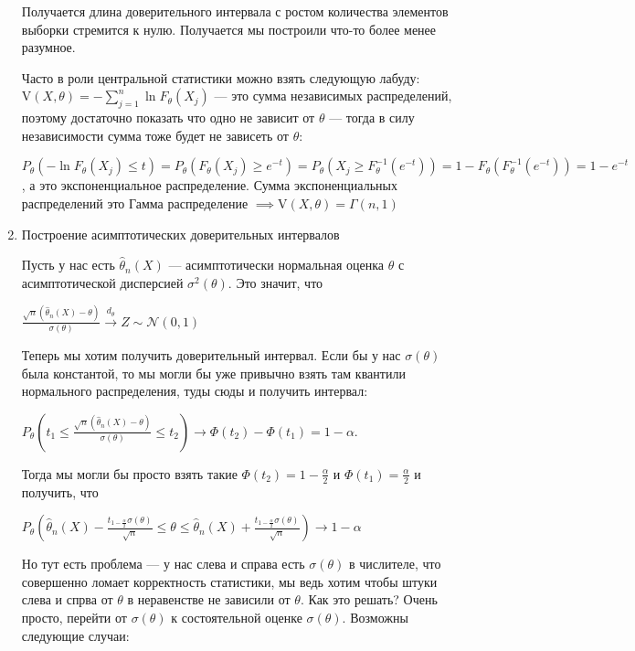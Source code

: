 \begin{enumerate}
\begin{example}
        Получается длина доверительного интервала с ростом количества элементов выборки стремится к нулю.
        Получается мы построили что-то более менее разумное.

        Часто в роли центральной статистики можно взять следующую лабуду: 
        $\text{V}(X, \theta) = -\sum_{j = 1}^n \ln F_\theta(X_j)$ --- это сумма независимых распределений,
        поэтому достаточно показать что одно не зависит от $\theta$ --- тогда в силу независимости сумма тоже
        будет не зависеть от $\theta$:

        $P_\theta(-\ln F_\theta(X_j) \leq t) = P_\theta(F_\theta(X_j) \geq e^{-t}) =
        P_\theta(X_j \geq F_\theta^{-1}(e^{-t})) = 1 - F_\theta(F_\theta^{-1}(e^{-t})) = 1 - e^{-t}$, а это
        экспоненциальное распределение. Сумма экспоненциальных распределений это Гамма распределение
        $\implies \text{V}(X, \theta) = \Gamma(n, 1)$
    \end{example}

    \item Построение асимптотических доверительных интервалов
    
    Пусть у нас есть $\hat{\theta}_n(X)$ --- асимптотически нормальная оценка $\theta$ с
    асимптотической дисперсией $\sigma^2(\theta)$. Это значит, что

    $\frac{\sqrt{n}(\hat{\theta}_n(X) - \theta)}{\sigma(\theta)} \xrightarrow{d_\theta} Z \sim \mathcal{N}(0, 1)$

    Теперь мы хотим получить доверительный интервал. Если бы у нас $\sigma(\theta)$ была константой,
    то мы могли бы уже привычно взять там квантили нормального распределения, туды сюды и получить
    интервал: 
    
    $P_\theta(t_1 \leq \frac{\sqrt{n}(\hat{\theta}_n(X) - \theta)}{\sigma(\theta)} \leq t_2)
    \to \Phi(t_2) - \Phi(t_1) = 1 - \alpha$. 
    
    Тогда мы могли бы просто взять такие $\Phi(t_2) = 1 - \frac{\alpha}{2}$
    и $\Phi(t_1) = \frac{\alpha}{2}$ и получить, что 
    
    $P_\theta(\hat{\theta}_n(X) - \frac{t_{1 - \frac{\alpha}{2}}\sigma(\theta)}{\sqrt{n}}
    \leq \theta \leq \hat{\theta}_n(X) + \frac{t_{1 - \frac{\alpha}{2}}\sigma(\theta)}{\sqrt{n}}) 
    \to 1 - \alpha$

    Но тут есть проблема --- у нас слева и справа есть $\sigma(\theta)$ в числителе,
    что совершенно ломает корректность статистики, мы ведь хотим чтобы штуки слева и спрва от $\theta$
    в неравенстве не зависили от $\theta$. Как это решать? Очень просто, перейти от $\sigma(\theta)$ 
    к состоятельной оценке $\sigma(\theta)$. Возможны следующие случаи:


\end{enumerate}
